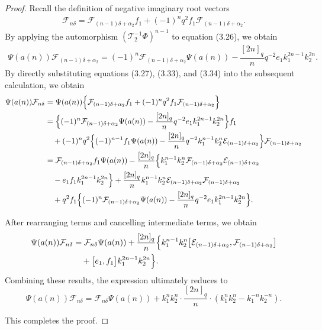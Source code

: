 \documentclass[12pt]{amsart}
\numberwithin{equation}{section}
\numberwithin{equation}{section}
\begin{document}
\begin{proof}
Recall the definition of negative imaginary root vectors  
\begin{align}
\mathcal{F}_{n\delta}=\mathcal{F}_{(n-1)\delta+\alpha_2}f_1+(-1)^{n}q^2f_1\mathcal{F}_{(n-1)\delta+\alpha_2}.
\end{align}
By applying the automorphism \((\mathcal{T}^{-1}_2\Phi)^{n-1}\)  to equation (3.26), we obtain
\begin{align}
\Psi(a(n))\mathcal{F}_{(n-1)\delta+\alpha_2}
=(-1)^n\mathcal{F}_{(n-1)\delta+\alpha_2}\Psi(a(n))-\dfrac{[2n]_q}{n}q^{-2}e_1k^{2n-1}_1k^{2n}_2.
\end{align}
By directly substituting equations (3.27), (3.33), and (3.34) into the subsequent calculation, we obtain
\begin{align*}
\Psi(a(n))\mathcal{F}_{n\delta} &=\Psi(a(n))\Bigl\{ \mathcal{F}_{(n-1)\delta+\alpha_2}f_1 + (-1)^n q^2 f_1 \mathcal{F}_{(n-1)\delta+\alpha_2} \Bigr\}\\
&=\Bigl\{(-1)^n\mathcal{F}_{(n-1)\delta+\alpha_2}\Psi(a(n))-\dfrac{[2n]_q}{n}q^{-2}e_1k^{2n-1}_1k^{2n}_2\Bigr\}f_1\\
&\quad+(-1)^nq^2\Bigl\{(-1)^{n-1}f_1\Psi(a(n)) - \frac{[2n]_q}{n} q^{-2} k_1^{n-1} k_2^n \mathcal{E}_{(n-1)\delta+\alpha_2}
\Bigr\}\mathcal{F}_{(n-1)\delta+\alpha_2}\\
&=\mathcal{F}_{(n-1)\delta+\alpha_2}f_1\Psi(a(n))-\dfrac{[2n]_q}{n}\Bigl\{k^{n-1}_1k^{n}_2\mathcal{F}_{(n-1)\delta+\alpha_2}\mathcal{E}_{(n-1)\delta+\alpha_2}\\
&\quad-e_1f_1k^{2n-1}_1k^{2n}_2\Bigr\}+ \frac{[2n]_q}{n} k_1^{n-1} k_2^{n}\mathcal{E}_{(n-1)\delta+\alpha_2} \mathcal{F}_{(n-1)\delta+\alpha_2}\\
&\quad+q^2f_1 \Bigl\{ (-1)^n \mathcal{F}_{(n-1)\delta+\alpha_2}\Psi(a(n)) - \frac{[2n]_q}{n} q^{-2} e_1 k_1^{2n-1} k_2^{2n} \Bigr\}.
\end{align*}

After rearranging terms and cancelling intermediate terms, we obtain
\begin{align}
\Psi(a(n))\mathcal{F}_{n\delta} &= \mathcal{F}_{n\delta}\Psi(a(n)) + \frac{[2n]_q}{n} \Bigl\{ k_1^{n-1} k_2^n \bigl[ \mathcal{E}_{(n-1)\delta+\alpha_2}, \mathcal{F}_{(n-1)\delta+\alpha_2} \bigr] \nonumber\\
&\quad+ \bigl[ e_1, f_1 \bigr] k_1^{2n-1} k_2^{2n} \Bigr\}.
\end{align}
Combining these results, the expression ultimately reduces to
\[
\Psi(a(n))\mathcal{F}_{n\delta} = \mathcal{F}_{n\delta}\Psi(a(n)) +k_1^n k_2^n \cdot \frac{[2n]_q}{n} \cdot \left( k_1^n k_2^n - k_1^{-n} k_2^{-n} \right).
\]

This completes the proof.
\end{proof}
\end{document}
